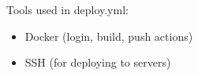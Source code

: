 \noindent  Tools used in deploy.yml:
\begin{itemize}
    \item Docker (login, build, push actions)
    \item SSH (for deploying to servers)
\end{itemize}





